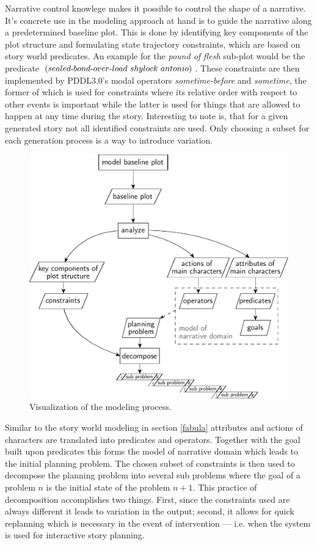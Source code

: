 Narrative control knowlege makes it possible to control the shape of a narrative. It's concrete use in the modeling approach at hand is to guide the narrative along a predetermined baseline plot. This is done by identifying key components of the plot structure and formulating state trajectory constraints, which are based on story world predicates. An example for the \emph{pound of flesh} sub-plot would be the predicate $(sealed\h bond\h over\h load\ shylock\ antonio)$. These constraints are then implemented by PDDL3.0's modal operators \emph{some\-time-before} and \emph{sometime}, the former of which is used for constraints where its relative order with respect to other events is important while the latter is used for things that are allowed to happen at any time during the story. Interesting to note is, that for a given generated story not all identified constraints are used. Only choosing a subset for each generation process is a way to introduce variation.
\begin{figure}[htbp]
 \centering
 \includegraphics[scale=0.6]{discourse_model}
 \caption{Visualization of the modeling process.}
 \label{fig:modproc}
\end{figure}

Similar to the story world modeling in section \ref{fabula} attributes and actions of characters are translated into predicates and operators. Together with the goal built upon predicates this forms the model of narrative domain which leads to the initial planning problem. The chosen subset of constraints is then used to decompose the planning problem into several sub problems where the goal of a problem $n$ is the initial state of the problem $n+1$. This practice of decomposition accomplishes two things. First, since the constraints used are always different it leads to variation in the output; second, it allows for quick replanning which is necessary in the event of intervention --- i.e. when the system is used for interactive story planning.

